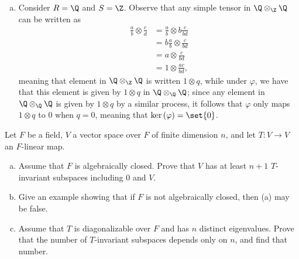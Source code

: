 \documentclass[10pt]{mypackage}
\begin{document}
\begin{solution}
\begin{enumerate}[(a)]
      Defining $\beta\colon M\times N\rightarrow S$ by $\left( m,n \right)\mapsto f(m)g(n)$, we observe that $\beta$ is $S$-bilinear, so it extends to an $S$-linear map $\theta\colon M\otimes_{S}N\rightarrow S$ satisfying $\theta\left( m\otimes n \right) = f(m)g(n)$. Therefore, we have
      \begin{align*}
        \theta\left( u \right) &= f\left( m \right)g\left( rn \right) - f\left( rm \right)g\left( n \right)\\
                                 &= 1\\
                                 &\neq 0.
      \end{align*}
      Therefore, $u\neq 0$.
    \item Consider $R = \Q$ and $S = \Z$. Observe that any simple tensor in $\Q\otimes_{\Z}\Q$ can be written as
      \begin{align*}
        \frac{a}{b}\otimes \frac{c}{d} &= \frac{a}{b} \otimes b\frac{c}{bd}\\
                                       &= b\frac{a}{b}\otimes \frac{c}{bd}\\
                                       &= a\otimes \frac{c}{bd}\\
                                       &= 1\otimes \frac{ac}{bd},
      \end{align*}
      meaning that element in $\Q\otimes_{\Z}\Q$ is written $1\otimes q$, while under $\varphi$, we have that this element is given by $1\otimes q$ in $\Q\otimes_{\Q}\Q$; since any element in $\Q\otimes_{\Q}\Q$ is given by $1\otimes q$ by a similar process, it follows that $\varphi$ only maps $1\otimes q$ to $0$ when $q = 0$, meaning that $\ker\left( \varphi \right) = \set{0}$.
  \end{enumerate}
\end{solution}
\begin{problem}[Problem 5]
  Let $F$ be a field, $V$ a vector space over $F$ of finite dimension $n$, and let $T\colon V\rightarrow V$ an $F$-linear map.
  \begin{enumerate}[(a)]
    \item Assume that $F$ is algebraically closed. Prove that $V$ has at least $n+1$ $T$-invariant subspaces including $0$ and $V$.
    \item Give an example showing that if $F$ is not algebraically closed, then (a) may be false.
    \item Assume that $T$ is diagonalizable over $F$ and has $n$ distinct eigenvalues. Prove that the number of $T$-invariant subspaces depends only on $n$, and find that number.
  \end{enumerate}
\end{problem}
\end{document}
